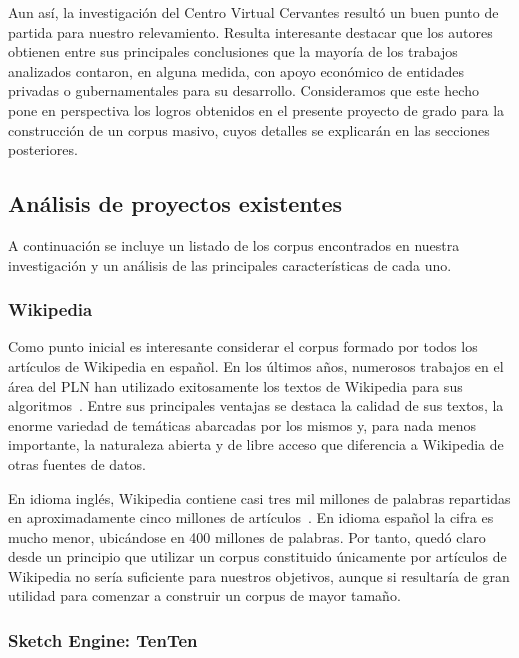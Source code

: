 Aun así, la investigación del Centro Virtual Cervantes resultó un buen punto de partida para nuestro
relevamiento. Resulta interesante destacar que los autores obtienen entre sus principales conclusiones
que la mayoría de los trabajos analizados contaron, en alguna medida, con apoyo económico de entidades
privadas o gubernamentales para su desarrollo. Consideramos que este hecho pone en perspectiva los logros
obtenidos en el presente proyecto de grado para la construcción de un corpus masivo, cuyos detalles se
explicarán en las secciones posteriores.

\subsection{Análisis de proyectos existentes}

A continuación se incluye un listado de los corpus encontrados en nuestra investigación y un análisis de
las principales características de cada uno.

\subsubsection{Wikipedia}

Como punto inicial es interesante considerar el corpus formado por todos los artículos de Wikipedia en
español. En los últimos años, numerosos trabajos en el área del PLN han utilizado exitosamente los
textos de Wikipedia para sus algoritmos~\cite{WikipediaNLP}. Entre sus principales ventajas se destaca
la calidad de sus textos, la enorme variedad de temáticas abarcadas por los mismos y, para nada menos
importante, la naturaleza abierta y de libre acceso que diferencia a Wikipedia de otras fuentes de datos.

En idioma inglés, Wikipedia contiene casi tres mil millones de palabras repartidas en aproximadamente
cinco millones de artículos~\cite{WikipediaSize}. En idioma español la cifra es mucho menor, ubicándose en
400 millones de palabras. Por tanto, quedó claro desde un principio que utilizar un corpus constituido
únicamente por artículos de Wikipedia no sería suficiente para nuestros objetivos, aunque si resultaría de
gran utilidad para comenzar a construir un corpus de mayor tamaño.

\subsubsection{Sketch Engine: TenTen}

